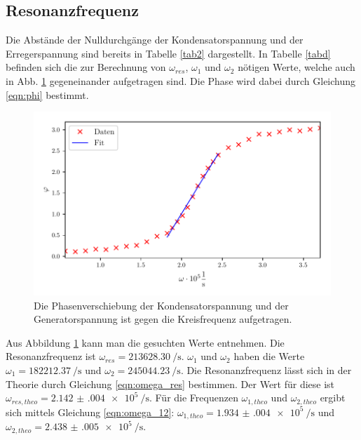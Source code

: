 \subsection{Resonanzfrequenz} %
Die Abstände der Nulldurchgänge der Kondensatorspannung und
der Erregerspannung sind bereits in Tabelle \ref{tab2}
dargestellt. In Tabelle \ref{tabd} befinden sich die
zur Berechnung von $\omega_{res}$, $\omega_{1}$ und $\omega_{2}$
nötigen Werte, welche auch in Abb. \ref{fig:plotd} gegeneinander
aufgetragen sind. Die Phase wird dabei durch Gleichung \eqref{eqn:phi}
bestimmt.

\begin{figure}
  \centering
  \includegraphics{build/plotd.pdf}
  \caption{Die Phasenverschiebung der Kondensatorspannung und der
  Generatorspannung ist gegen die Kreisfrequenz aufgetragen.} %
  \label{fig:plotd}
\end{figure}
\noindent Aus Abbildung \ref{fig:plotd} kann man die gesuchten Werte entnehmen. %
Die Resonanzfrequenz ist $\omega_{res} = \SI[per-mode=fraction]{213628.30}{\per\second}$.
$\omega_{1}$ und $\omega_{2}$ haben die Werte
$\omega_{1} = \SI[per-mode=fraction]{182212.37}{\per\second}$ und
$\omega_{2} = \SI[per-mode=fraction]{245044.23}{\per\second}$.
\newline
Die Resonanzfrequenz lässt sich in der Theorie durch 
Gleichung \eqref{eqn:omega_res} bestimmen.
Der Wert für diese ist $\omega_{res,theo} = \SI[per-mode=fraction]{2.142(004)e5}{\per\second}$.
Für die Frequenzen $\omega_{1,theo}$ und $\omega_{2,theo}$ ergibt sich
mittels Gleichung \eqref{eqn:omega_12}:
$\omega_{1,theo} = \SI[per-mode=fraction]{1.934(004)e5}{\per\second}$ und
$\omega_{2,theo} = \SI[per-mode=fraction]{2.438(005)e5}{\per\second}$.
